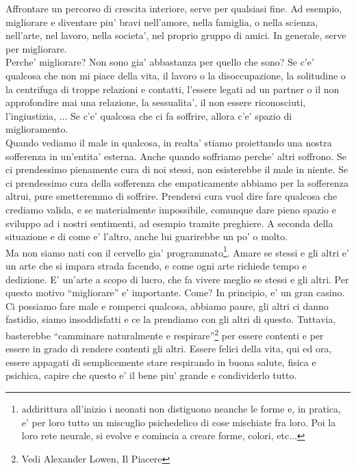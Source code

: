 Affrontare un percorso di crescita interiore, serve per qualsiasi fine. Ad esempio, migliorare e diventare piu' bravi nell'amore, nella famiglia, o nella scienza, nell'arte, nel lavoro, nella societa', nel proprio gruppo di amici. In generale, serve per migliorare.\\
Perche' migliorare? Non sono gia' abbastanza per quello che sono? Se c'e' qualcosa che non mi piace della vita, il lavoro o la disoccupazione, la solitudine o la centrifuga di troppe relazioni e contatti, l'essere legati ad un partner o il non approfondire mai una relazione, la sessualita', il non essere riconosciuti, l'ingiustizia, ... Se c'e' qualcosa che ci fa soffrire, allora c'e' spazio di miglioramento.\\
Quando vediamo il male in qualcosa, in realta' stiamo proiettando una nostra sofferenza in un'entita' esterna. Anche quando soffriamo perche' altri soffrono. Se ci prendessimo pienamente cura di noi stessi, non esisterebbe il male in niente. Se ci prendessimo cura della sofferenza che empaticamente abbiamo per la sofferenza altrui, pure smetteremmo di soffrire. Prendersi cura vuol dire fare qualcosa che crediamo valida, e se materialmente impossibile, comunque dare pieno spazio e sviluppo ad i nostri sentimenti, ad esempio tramite preghiere. A seconda della situazione e di come e' l'altro, anche lui guarirebbe un po' o molto.\\
Ma non siamo nati con il cervello gia' programmato\footnote{addirittura all'inizio i neonati non distiguono neanche le forme e, in pratica, e' per loro tutto un miscuglio psichedelico di cose mischiate fra loro. Poi la loro rete neurale, si evolve e comincia a creare forme, colori, etc...}. Amare se stessi e gli altri e' un arte che si impara strada facendo, e come ogni arte richiede tempo e dedizione. E' un'arte a scopo di lucro, che fa vivere meglio se stessi e gli altri. Per questo motivo ``migliorare'' e' importante. Come? In principio, e' un gran casino. Ci possiamo fare male e romperci qualcosa, abbiamo paure, gli altri ci danno fastidio, siamo insoddisfatti e ce la prendiamo con gli altri di questo. Tuttavia, basterebbe ``camminare naturalmente e respirare''\footnote{Vedi Alexander Lowen, Il Piacere} per essere contenti e per essere in grado di rendere contenti gli altri. Essere felici della vita, qui ed ora, essere appagati di semplicemente stare respirando in buona salute, fisica e psichica, capire che questo e' il bene piu' grande e condividerlo tutto.

